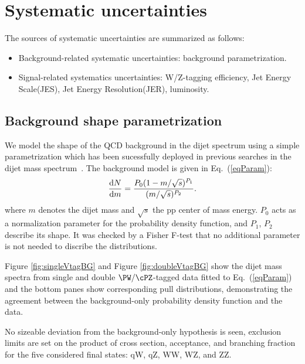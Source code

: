 \section{Systematic uncertainties}
\label{sec:systematics}
The sources of systematic uncertainties are summarized as
follows:
\begin{itemize}
\item Background-related systematic uncertainties: background parametrization.
\item Signal-related systematics uncertainties: W/Z-tagging efficiency, Jet Energy Scale(JES), Jet Energy Resolution(JER), luminosity.
\end{itemize}

\subsection{Background shape parametrization}
\label{sec:background}

We model the shape of the QCD background in the dijet spectrum 
using a simple parametrization which has been sucessfully deployed in
previous searches in the dijet mass spectrum~\cite{cmsdijet}.
The background model is given in Eq.~(\ref{eqParam}):
\begin{equation}
\frac{{\rm d}N}{{\rm d}m} = 
\frac{P_{0} (1 - m/\sqrt{s})^{P_{1}}}{(m/\sqrt{s})^{P_{2}
}} .
\label{eqParam}
\end{equation}
\noindent where $m$ denotes the dijet mass and $\sqrt{s}$ the pp center of mass energy.
$P_0$ acts as a normalization parameter for the probability
density function, and $P_1$, $P_2$ describe its shape.
It was checked by a Fisher F-test that no additional parameter is not needed to discribe the distributions.

Figure \ref{fig:singleVtagBG} and Figure \ref{fig:doubleVtagBG} show the dijet mass spectra from
single and double $\PW/\cPZ$-tagged data fitted to Eq.~(\ref{eqParam}) and the bottom panes show corresponding pull
distributions, demonstrating the agreement between the background-only
probability density function and the data.

No sizeable deviation from the background-only hypothesis is seen,
exclusion limits are set on the product of cross section, acceptance, and branching fraction for
the five considered final states: qW, qZ, WW, WZ, and ZZ.

